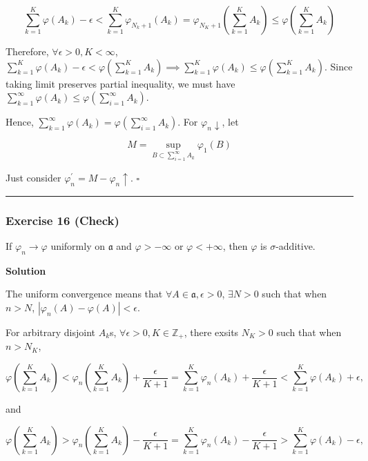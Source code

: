 \documentclass[
]{article}
\begin{document}
\[\sum_{k=1}^K \varphi(A_k) - \epsilon < \sum_{k=1}^K\varphi_{N_k+1}(A_k) = \varphi_{N_K+1}\left(\sum_{k=1}^K A_k \right) \le \varphi\left(\sum_{k=1}^K A_k \right)\]

Therefore, \(\forall \epsilon > 0, K < \infty\),
\(\sum_{k=1}^K \varphi(A_k) - \epsilon < \varphi\left(\sum_{k=1}^K A_k \right) \implies \sum_{k=1}^K \varphi(A_k) \le \varphi\left(\sum_{k=1}^K A_k \right)\).
Since taking limit preserves partial inequality, we must have
\(\sum_{k=1}^\infty \varphi(A_k) \le \varphi\left(\sum_{i=1}^\infty A_k \right)\).

Hence,
\(\sum_{k=1}^\infty \varphi(A_k) = \varphi\left(\sum_{i=1}^\infty A_k \right)\).
For \(\varphi_n \downarrow\), let

\[M = \sup_{B \subset \sum_{i=1}^\infty A_k} \varphi_1(B)\]

Just consider \(\varphi_n^\prime = M - \varphi_n \uparrow\). \(\square\)

\begin{center}\rule{0.5\linewidth}{0.5pt}\end{center}

\hypertarget{exercise-16-check}{%
  \subsubsection{Exercise 16 (Check)}\label{exercise-16-check}}

If \(\varphi_n \rightarrow \varphi\) uniformly on \(\mathfrak a\) and
\(\varphi>-\infty\) or \(\varphi<+\infty\), then \(\varphi\) is
\(\sigma\)-additive.

\textbf{Solution}

The uniform convergence means that
\(\forall A\in \mathfrak a, \epsilon > 0\), \(\exists N > 0\) such that
when \(n > N\), \(|\varphi_n(A) - \varphi(A)| < \epsilon\).

For arbitrary disjoint \(A_k\)\textquotesingle s,
\(\forall \epsilon > 0, K \in \mathbb Z_+\), there exsits \(N_K > 0\)
such that when \(n > N_K\),

\[\varphi\left(\sum_{k=1}^K A_k\right) < \varphi_n\left(\sum_{k=1}^K A_k\right) + \frac{\epsilon}{K+1} = \sum_{k=1}^K\varphi_n\left( A_k\right) + \frac{\epsilon}{K+1} < \sum_{k=1}^K\varphi\left( A_k\right) + \epsilon,\]

and

\[\varphi\left(\sum_{k=1}^K A_k\right) > \varphi_n\left(\sum_{k=1}^K A_k\right) - \frac{\epsilon}{K+1} = \sum_{k=1}^K\varphi_n\left( A_k\right) - \frac{\epsilon}{K+1} > \sum_{k=1}^K\varphi\left( A_k\right) - \epsilon,\]
\end{document}
